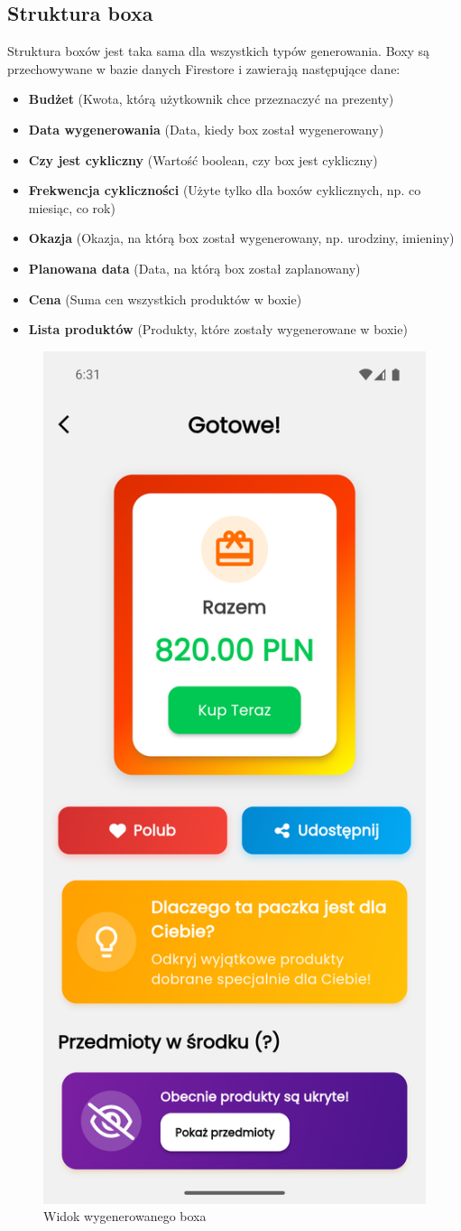\documentclass[a4paper, 12pt]{article}
\begin{document}
\newpage

\subsection{Struktura boxa}
Struktura boxów jest taka sama dla wszystkich typów generowania. Boxy są przechowywane w bazie danych Firestore i zawierają następujące dane:
\begin{itemize}
    \item \textbf{Budżet} (Kwota, którą użytkownik chce przeznaczyć na prezenty)
    \item \textbf{Data wygenerowania} (Data, kiedy box został wygenerowany)
    \item \textbf{Czy jest cykliczny} (Wartość boolean, czy box jest cykliczny)
    \item \textbf{Frekwencja cykliczności} (Użyte tylko dla boxów cyklicznych, np. co miesiąc, co rok)
    \item \textbf{Okazja} (Okazja, na którą box został wygenerowany, np. urodziny, imieniny)
    \item \textbf{Planowana data} (Data, na którą box został zaplanowany)
    \item \textbf{Cena} (Suma cen wszystkich produktów w boxie)
    \item \textbf{Lista produktów} (Produkty, które zostały wygenerowane w boxie)
\end{itemize}
\begin{figure}[H]
    \centering
    \includegraphics[width=0.3\linewidth,keepaspectratio]{images/box_summary.png}
    \caption{Widok wygenerowanego boxa}
    \label{fig:box-summary}
\end{figure}
\end{document}
